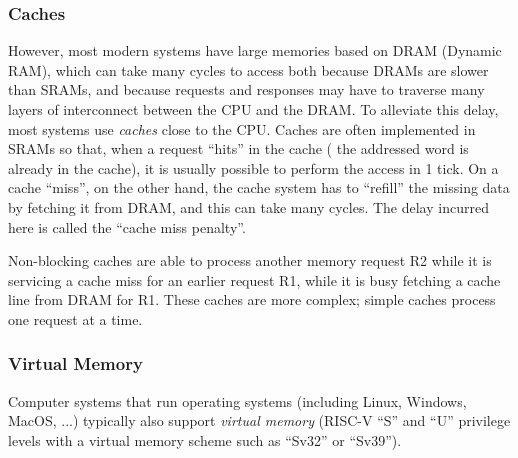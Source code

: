 
\subsubsection{Caches}



However, most modern systems have large memories based on DRAM
(Dynamic RAM), which can take many cycles to access both because DRAMs
are slower than SRAMs, and because requests and responses may have to
traverse many layers of interconnect between the CPU and the DRAM.  To
alleviate this delay, most systems use \emph{caches} close to the CPU.
Caches are often implemented in SRAMs so that, when a request ``hits''
in the cache ({\ie} the addressed word is already in the cache), it is
usually possible to perform the access in 1 tick.  On a cache
``miss'', on the other hand, the cache system has to ``refill'' the
missing data by fetching it from DRAM, and this can take many cycles.
The delay incurred here is called the ``cache miss penalty''.


Non-blocking caches are able to process another memory request R2
while it is servicing a cache miss for an earlier request R1, {\ie}
while it is busy fetching a cache line from DRAM for R1.  These caches
are more complex; simple caches process one request at a time.


\subsubsection{Virtual Memory}


Computer systems that run operating systems (including Linux, Windows,
MacOS, ...) typically also support \emph{virtual memory} (RISC-V ``S''
and ``U'' privilege levels with a virtual memory scheme such as
``Sv32'' or ``Sv39'').


